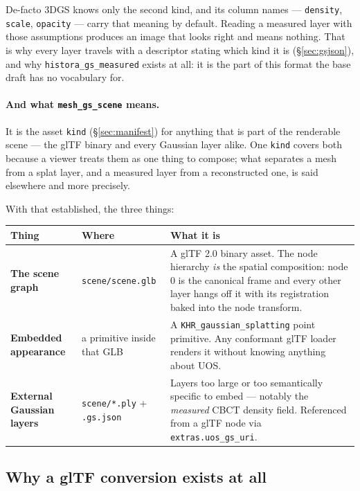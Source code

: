 \documentclass[11pt,a4paper]{article}
\newcommand{\code}[1]{\texttt{\small #1}}
\begin{document}
De-facto 3DGS knows only the second kind, and its column names --- \code{density},
\code{scale}, \code{opacity} --- carry that meaning by default. Reading a measured layer
with those assumptions produces an image that looks right and means nothing. That is why
every layer travels with a descriptor stating which kind it is (\S\ref{sec:gsjson}), and
why \code{histora\_gs\_measured} exists at all: it is the part of this format the base draft
has no vocabulary for.

\paragraph{And what \code{mesh\_gs\_scene} means.} It is the asset \code{kind}
(\S\ref{sec:manifest}) for anything that is part of the renderable scene --- the glTF
binary and every Gaussian layer alike. One \code{kind} covers both because a viewer treats
them as one thing to compose; what separates a mesh from a splat layer, and a measured
layer from a reconstructed one, is said elsewhere and more precisely.

\vspace{6px}
With that established, the three things:

\begin{longtable}{L{3.6cm} L{4.4cm} L{7.0cm}}
\toprule
\textbf{Thing} & \textbf{Where} & \textbf{What it is}\\
\midrule
\endhead
\textbf{The scene graph} & \code{scene/scene.glb} & A glTF 2.0 binary asset. The node
hierarchy \emph{is} the spatial composition: node 0 is the canonical frame and every other
layer hangs off it with its registration baked into the node transform.\\
\textbf{Embedded appearance} & a primitive inside that GLB & A
\code{KHR\_gaussian\_splatting} point primitive. Any conformant glTF loader renders it
without knowing anything about UOS.\\
\textbf{External Gaussian layers} & \code{scene/*.ply} + \code{*.gs.json} & Layers too
large or too semantically specific to embed --- notably the \emph{measured} CBCT density
field. Referenced from a glTF node via \code{extras.uos\_gs\_uri}.\\
\bottomrule
\end{longtable}

\subsection{Why a glTF conversion exists at all}
\end{document}
